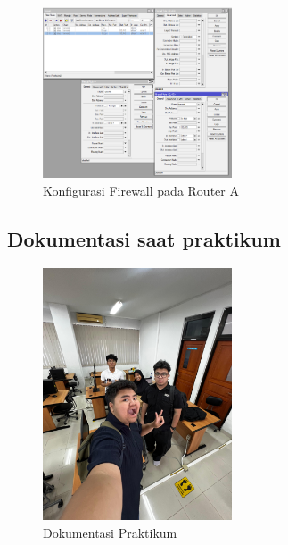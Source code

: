\begin{figure}[h]
    \centering
    \includegraphics[width=0.5\textwidth]{dokum/filter rule r1.png}
    \caption{Konfigurasi Firewall pada Router A}
    \label{fig:firewall-ra}
\end{figure}

\subsection{Dokumentasi saat praktikum}
\begin{figure}[h]
    \centering
    \includegraphics[width=0.5\textwidth]{dokum/dokum.jpg}
    \caption{Dokumentasi Praktikum}
    \label{fig:dokum}
\end{figure}